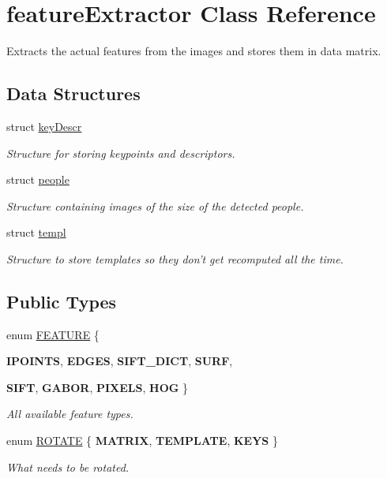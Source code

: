 \hypertarget{classfeatureExtractor}{
\section{featureExtractor Class Reference}
\label{classfeatureExtractor}
}


Extracts the actual features from the images and stores them in data matrix.  


\subsection*{Data Structures}
\begin{DoxyCompactItemize}
\item 
struct \hyperlink{structfeatureExtractor_1_1keyDescr}{keyDescr}
\begin{DoxyCompactList}\small\item\em Structure for storing keypoints and descriptors. \item\end{DoxyCompactList}\item 
struct \hyperlink{structfeatureExtractor_1_1people}{people}
\begin{DoxyCompactList}\small\item\em Structure containing images of the size of the detected people. \item\end{DoxyCompactList}\item 
struct \hyperlink{structfeatureExtractor_1_1templ}{templ}
\begin{DoxyCompactList}\small\item\em Structure to store templates so they don't get recomputed all the time. \item\end{DoxyCompactList}\end{DoxyCompactItemize}
\subsection*{Public Types}
\begin{DoxyCompactItemize}
\item 
enum \hyperlink{classfeatureExtractor_a84a8847c4124b284d1d5ae20bc9be583}{FEATURE} \{ \par
{\bfseries IPOINTS}, 
{\bfseries EDGES}, 
{\bfseries SIFT\_\-DICT}, 
{\bfseries SURF}, 
\par
{\bfseries SIFT}, 
{\bfseries GABOR}, 
{\bfseries PIXELS}, 
{\bfseries HOG}
 \}
\begin{DoxyCompactList}\small\item\em All available feature types. \item\end{DoxyCompactList}\item 
enum \hyperlink{classfeatureExtractor_a99e9f9e991fdf79bafc52c2ebbe51710}{ROTATE} \{ {\bfseries MATRIX}, 
{\bfseries TEMPLATE}, 
{\bfseries KEYS}
 \}
\begin{DoxyCompactList}\small\item\em What needs to be rotated. \item\end{DoxyCompactList}\end{DoxyCompactItemize}

